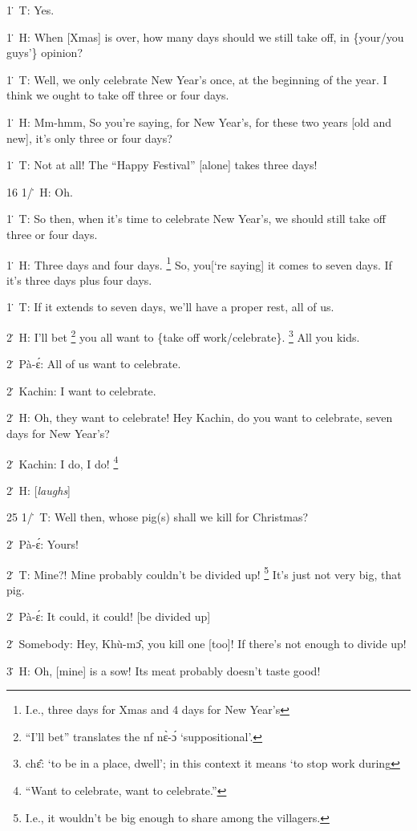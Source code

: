 1\. T: Yes.

1\. H: When [Xmas] is over, how many days should we still take off, in \{your/you
guys'\} opinion?

1\. T: Well, we only celebrate New Year's once, at the beginning of the year.
I think we ought to take off three or four days.

1\. H: Mm-hmm,  So you're saying, for New Year's, for these two years [old and
new], it's only three or four days?

1\. T: Not at all!  The ``Happy Festival''  [alone] takes three days!

16 1/\. H: Oh.

1\. T: So then, when it's time to celebrate New Year's, we should still take off
three or four days.

1\. H: Three days and four days. \footnote{I.e., three days for Xmas and 4 days for New Year's} So, you[`re saying] it comes to seven days.
If it's three days plus four days.

1\. T: If it extends to seven days, we'll have a proper rest, all of us.

2\. H: I'll bet \footnote{``I'll bet'' translates the nf nɛ̀-ɔ́ `suppositional'.} you all want to \{take off work/celebrate\}. \footnote{chɛ̂: `to be in a place, dwell'; in this context it means `to stop work during}  All you kids.

2\. Pà-ɛ́: All of us want to celebrate.

2\. Kachin: I want to celebrate.

2\. H: Oh, they want to celebrate!  Hey Kachin, do you want to celebrate, seven
days for New Year's?

2\. Kachin: I do, I do! \footnote{``Want to celebrate, want to celebrate.''}

2\. H: [\textit{laughs}]

25 1/\. T: Well then, whose pig(s) shall we kill for Christmas?

2\. Pà-ɛ́: Yours!

2\. T: Mine?!  Mine probably couldn't be divided up! \footnote{I.e., it wouldn't be big enough to share among the villagers.}  It's just not very big,
that pig.

2\. Pà-ɛ́: It could, it could! [be divided up]

2\. Somebody: Hey, Khù-mɔ̂, you kill one [too]!  If there's not enough to divide
up!

3\. H: Oh, [mine] is a sow!  Its meat probably doesn't taste good!

